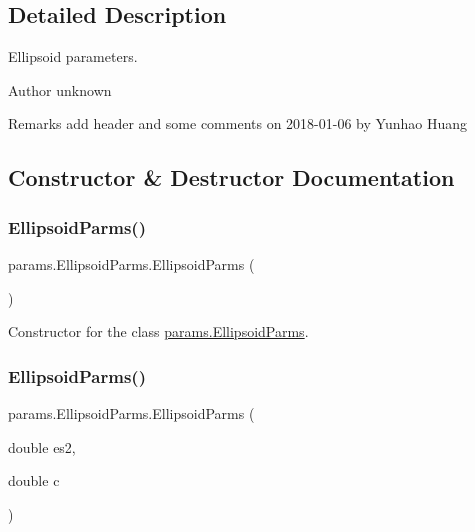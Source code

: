 \subsection{Detailed Description}
Ellipsoid parameters. 

\begin{DoxyAuthor}{Author}
unknown 
\end{DoxyAuthor}
\begin{DoxyRemark}{Remarks}
add header and some comments on 2018-\/01-\/06 by Yunhao Huang 
\end{DoxyRemark}


\subsection{Constructor \& Destructor Documentation}
\mbox{\label{classparams_1_1_ellipsoid_parms_ae8dcc24aa03ce1f0c6ccd2daf1c549fc}} 
\subsubsection{\texorpdfstring{Ellipsoid\+Parms()}{EllipsoidParms()}\hspace{0.1cm}{\footnotesize\ttfamily [1/2]}}
{\footnotesize\ttfamily params.\+Ellipsoid\+Parms.\+Ellipsoid\+Parms (\begin{DoxyParamCaption}{ }\end{DoxyParamCaption})}



Constructor for the class \hyperlink{classparams_1_1_ellipsoid_parms}{params.\+Ellipsoid\+Parms}. 

\mbox{\label{classparams_1_1_ellipsoid_parms_a76412304312a0a253086d195874110c0}} 
\subsubsection{\texorpdfstring{Ellipsoid\+Parms()}{EllipsoidParms()}\hspace{0.1cm}{\footnotesize\ttfamily [2/2]}}
{\footnotesize\ttfamily params.\+Ellipsoid\+Parms.\+Ellipsoid\+Parms (\begin{DoxyParamCaption}\item[{double}]{es2,  }\item[{double}]{c }\end{DoxyParamCaption})}



